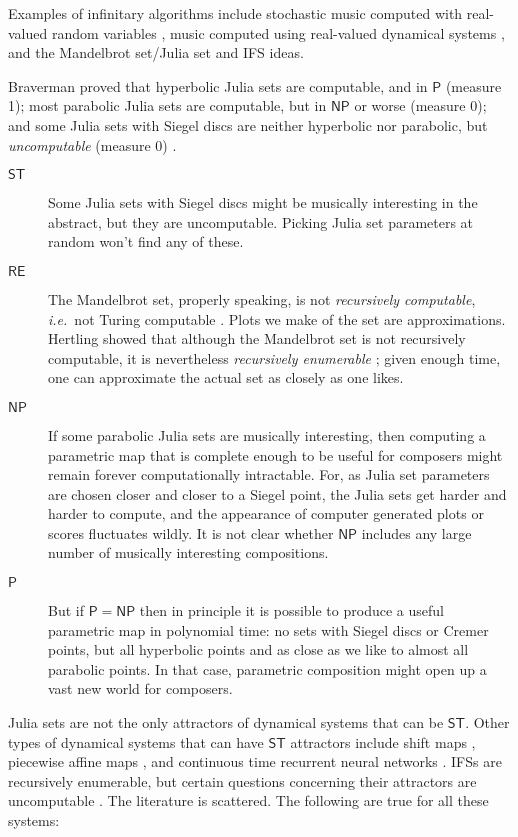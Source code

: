 \documentclass[]{interact}
\theoremstyle{plain}%
\theoremstyle{definition}
\theoremstyle{remark}
\begin{document}
Examples of infinitary algorithms include stochastic music computed with real-valued random variables \citep{xenakis2001formalized}, music computed using real-valued dynamical systems \citep{voss1975noise, gardner1978fractal, beyls1991chaos}, and the Mandelbrot set/Julia set and IFS ideas. 

Braverman proved that hyperbolic Julia sets are computable, and in $\mathsf{P}$ (measure 1); most parabolic Julia sets are computable, but in $\mathsf{NP}$ or worse (measure 0); and some Julia sets with Siegel discs are neither hyperbolic nor parabolic, but \emph{uncomputable} (measure 0) \citep{braverman2006non, braverman2008computability, braverman2009computability}.
\begin{description}
\item[$\mathsf{ST}$]  Some Julia sets with Siegel discs might be musically interesting in the abstract, but they are uncomputable. Picking Julia set parameters at random won't find any of these.
\item[$\mathsf{RE}$] The Mandelbrot set, properly speaking, is not \emph{recursively computable}, \emph{i.e.}\ not Turing computable \citep{blum1993godel}. Plots we make of the set are approximations. Hertling showed that although the Mandelbrot set is not recursively computable, it is nevertheless \emph{recursively enumerable} \citep{Hertling2005-HERITM-3}; given enough time, one can approximate the actual set as closely as one likes. 
\item[$\mathsf{NP}$] If some parabolic Julia sets are musically interesting, then computing a parametric map that is complete enough to be useful for composers might remain forever computationally intractable. For, as Julia set parameters are chosen closer and closer to a Siegel point, the Julia sets get harder and harder to compute, and the appearance of computer generated plots or scores fluctuates wildly. It is not clear whether $\mathsf{NP}$ includes any large number of musically interesting compositions.
\item[$\mathsf{P}$] But if $\mathsf{P} = \mathsf{NP}$ then in principle it is possible to produce a useful parametric map in polynomial time: no sets with Siegel discs or Cremer points, but all hyperbolic points and as close as we like to almost all parabolic points. In that case, parametric composition might open up a vast new world for composers.
\end{description}

Julia sets are not the only attractors of dynamical systems that can be $\mathsf{ST}$. Other types of dynamical systems that can have $\mathsf{ST}$ attractors include shift maps \citep{moore1991generalized}, piecewise affine maps \citep{Bazille_2018}, and continuous time recurrent neural networks \citep{10531294}. IFSs are recursively enumerable, but certain questions concerning their attractors are uncomputable \citep{dube1993undecidable}. The literature is scattered. The following are true for all these systems:
\end{document}
